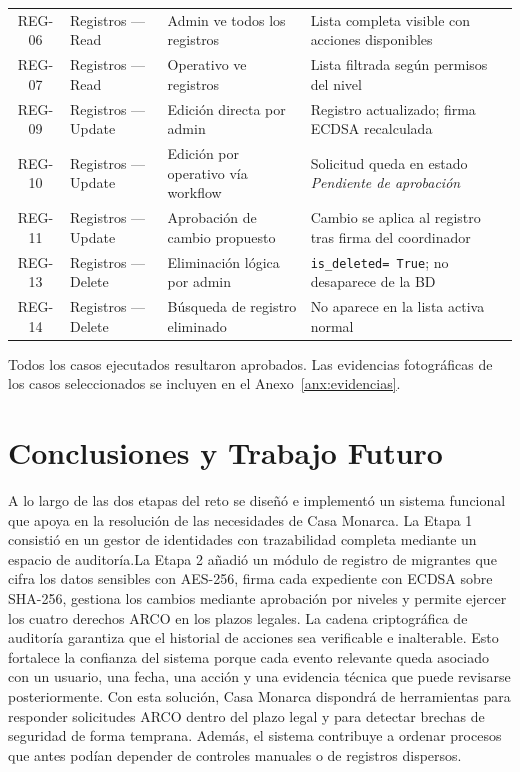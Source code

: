 \documentclass[10pt,letterpaper]{report}
\newcommand{\cmark}{\ding{51}}   %
\begin{document}
\begin{longtable}{c p{2.0cm} p{3.2cm} p{3.2cm} c}
REG-06 & Registros --- Read & Admin ve todos los registros & Lista completa visible con acciones disponibles & \cmark \\[4pt]
REG-07 & Registros --- Read & Operativo ve registros & Lista filtrada según permisos del nivel & \cmark \\[4pt]
REG-09 & Registros --- Update & Edición directa por admin & Registro actualizado; firma ECDSA recalculada & \cmark \\[4pt]
REG-10 & Registros --- Update & Edición por operativo vía workflow & Solicitud queda en estado \textit{Pendiente de aprobación} & \cmark \\[4pt]
REG-11 & Registros --- Update & Aprobación de cambio propuesto & Cambio se aplica al registro tras firma del coordinador & \cmark \\[4pt]
REG-13 & Registros --- Delete & Eliminación lógica por admin & \texttt{is\_deleted= True}; no desaparece de la BD & \cmark \\[4pt]
REG-14 & Registros --- Delete & Búsqueda de registro eliminado & No aparece en la lista activa normal & \cmark \\
\end{longtable}

Todos los casos ejecutados resultaron aprobados. Las evidencias fotográficas de los casos seleccionados se incluyen en el Anexo~\ref{anx:evidencias}.

\chapter{Conclusiones y Trabajo Futuro}

A lo largo de las dos etapas del reto se diseñó e implementó un sistema funcional que apoya en la resolución de las necesidades de Casa Monarca. La Etapa 1 consistió en un gestor de identidades con trazabilidad completa mediante un espacio de auditoría.La Etapa 2 añadió un módulo de registro de migrantes que cifra los datos sensibles con AES-256, firma cada expediente con ECDSA sobre SHA-256, gestiona los cambios mediante aprobación por niveles y permite ejercer los cuatro derechos ARCO en los plazos legales. La cadena criptográfica de auditoría garantiza que el historial de acciones sea verificable e inalterable. Esto fortalece la confianza del sistema porque cada evento relevante queda asociado con un usuario, una fecha, una acción y una evidencia técnica que puede revisarse posteriormente. Con esta solución, Casa Monarca dispondrá de herramientas para responder solicitudes ARCO dentro del plazo legal y para detectar brechas de seguridad de forma temprana. Además, el sistema contribuye a ordenar procesos que antes podían depender de controles manuales o de registros dispersos.
\end{document}
